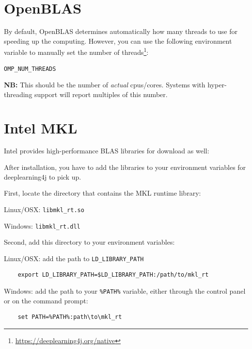 \documentclass[a4paper]{book}
\begin{document}
\chapter{OpenBLAS}
By default, OpenBLAS determines automatically how many threads to use for
speeding up the computing. However, you can use the following environment
variable to manually set the number of
threads\footnote{\url{https://deeplearning4j.org/native}{}}:
\begin{verbatim}
OMP_NUM_THREADS
\end{verbatim}
\textbf{NB:} This should be the number of \textit{actual} cpus/cores.
Systems with hyper-threading support will report multiples of this number.


\chapter{Intel MKL}
Intel provides high-performance BLAS libraries for download as well\cite{mkl}:

After installation, you have to add the libraries to your environment
variables for deeplearning4j to pick up.

\noindent First, locate the directory that contains the MKL runtime library:
\begin{tight_itemize}
  \item Linux/OSX: \texttt{libmkl\_rt.so}
  \item Windows: \texttt{libmkl\_rt.dll}
\end{tight_itemize}

\noindent Second, add this directory to your environment variables:
\begin{tight_itemize}
  \item Linux/OSX: add the path to \texttt{LD\_LIBRARY\_PATH}
    \begin{verbatim}
    export LD_LIBRARY_PATH=$LD_LIBRARY_PATH:/path/to/mkl_rt
    \end{verbatim}
  \item Windows: add the path to your \texttt{\%PATH\%} variable, either
  through the control panel or on the command prompt:
    \begin{verbatim}
    set PATH=%PATH%:path\to\mkl_rt
    \end{verbatim}
\end{tight_itemize}



\end{document}
